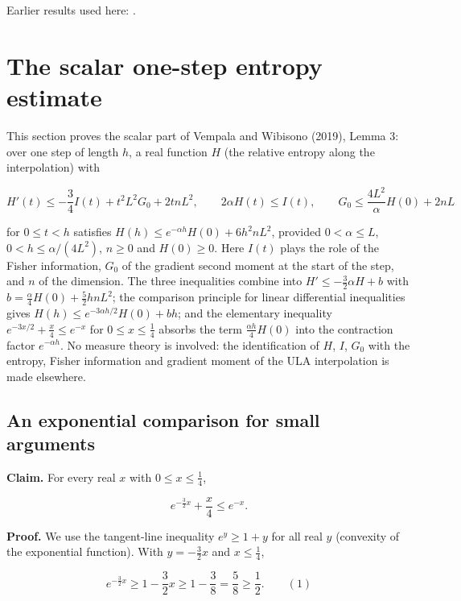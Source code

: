 \documentclass[11pt,a4paper]{report}
\begin{document}
Earlier results used here: \cite[Section~3.26.3]{LangevinLean2026ULASC}.
\section{\texorpdfstring{The scalar one-step entropy estimate}{The scalar one-step entropy estimate}}
\label{proof-module-UnadjustedLangevin-LSI-OneStep-lean}


This section proves the scalar part of Vempala and Wibisono (2019), Lemma 3: over one step of length \(h\), a real function \(H\) (the relative entropy along the interpolation) with


\[H'(t)\le-\frac34I(t)+t^2L^2G_0+2tnL^2,\qquad 2\alpha H(t)\le I(t),\qquad G_0\le\frac{4L^2}{\alpha}H(0)+2nL\]


for \(0\le t<h\) satisfies \(H(h)\le e^{-\alpha h}H(0)+6h^2nL^2\), provided \(0<\alpha\le L\), \(0<h\le\alpha/(4L^2)\), \(n\ge0\) and \(H(0)\ge0\). Here \(I(t)\) plays the role of the Fisher information, \(G_0\) of the gradient second moment at the start of the step, and \(n\) of the dimension. The three inequalities combine into \(H'\le-\frac32\alpha H+b\) with \(b=\frac\alpha4H(0)+\frac52hnL^2\); the comparison principle for linear differential inequalities gives \(H(h)\le e^{-3\alpha h/2}H(0)+bh\); and the elementary inequality \(e^{-3x/2}+\frac x4\le e^{-x}\) for \(0\le x\le\frac14\) absorbs the term \(\frac{\alpha h}4H(0)\) into the contraction factor \(e^{-\alpha h}\). No measure theory is involved: the identification of \(H\), \(I\), \(G_0\) with the entropy, Fisher information and gradient moment of the ULA interpolation is made elsewhere.

\subsection{\texorpdfstring{An exponential comparison for small arguments}{An exponential comparison for small arguments}}
\label{report-step-UnadjustedLangevin-LSI-OneStep-lean-1}


\textbf{Claim.} For every real \(x\) with \(0\le x\le\frac14\),


\[e^{-\frac32x}+\frac x4\le e^{-x}.\]


\textbf{Proof.} We use the tangent-line inequality \(e^y\ge1+y\) for all real \(y\) (convexity of the exponential function). With \(y=-\frac32x\) and \(x\le\frac14\),


\[e^{-\frac32x}\ge1-\frac32x\ge1-\frac38=\frac58\ge\frac12.\qquad(1)\]
\end{document}
